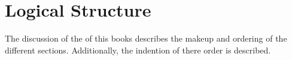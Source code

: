 \documentclass[latexsweetspot.tex]{subfiles}
\begin{document}
\chapter{Logical Structure}
The discussion of the  of this books describes the makeup and ordering
of the different sections.
Additionally, the indention of there order is described.
\end{document}
